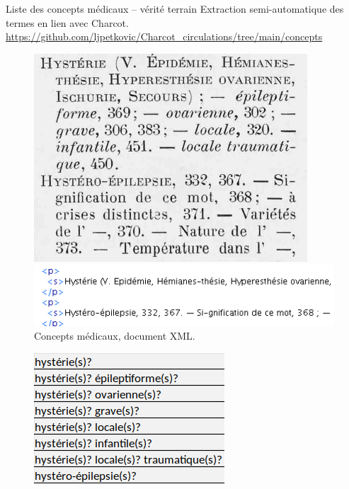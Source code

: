 \begin{frame}{Liste des concepts médicaux -- vérité terrain}
	Extraction semi-automatique des termes en lien avec Charcot.\\{\scriptsize\url{https://github.com/ljpetkovic/Charcot\_circulations/tree/main/concepts}}
	
	\begin{figure}[!htb]
		\centering
		\begin{minipage}{.5\textwidth}
			\centering
			\includegraphics[width=0.6\linewidth, height=0.3\textheight]{pic/concepts-pdf}
			\caption{Index des termes \citep{charcot1892oeuvres}.}
			\label{fig:prob1_6_2}
		\end{minipage}%
		\begin{minipage}{.5\textwidth}
			\centering
			\includegraphics[width=1\linewidth, height=0.15\textheight]{pic/concepts-xml}
			\caption{Concepts médicaux, document XML.}
			\label{fig:prob1_6_1}
		\end{minipage}
	\end{figure}
 \begin{figure}[!htb]
	\centering
	\begin{minipage}{.5\textwidth}
		\centering
		\includegraphics[width=0.6\linewidth, height=0.25\textheight]{pic/concepts-csv}

\end{minipage}
\end{figure}
\end{frame}
